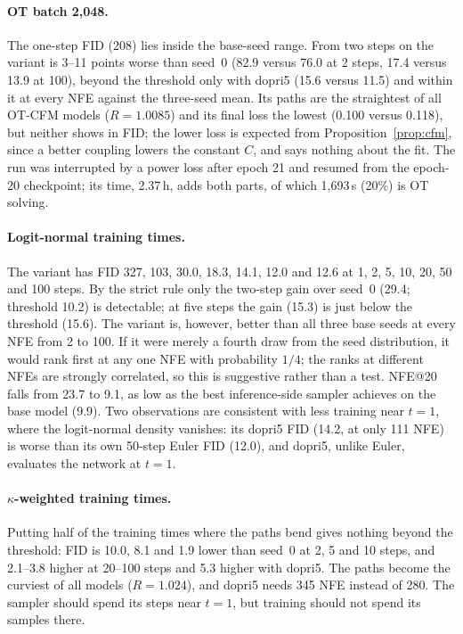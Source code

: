 \paragraph{OT batch 2,048.} The one-step FID (208) lies inside the base-seed range. From two steps on the variant is 3--11 points worse than seed~0 (82.9 versus 76.0 at 2 steps, 17.4 versus 13.9 at 100), beyond the threshold only with dopri5 (15.6 versus 11.5) and within it at every NFE against the three-seed mean. Its paths are the straightest of all OT-CFM models ($R=1.0085$) and its final loss the lowest (0.100 versus 0.118), but neither shows in FID; the lower loss is expected from Proposition~\ref{prop:cfm}, since a better coupling lowers the constant $C$, and says nothing about the fit. The run was interrupted by a power loss after epoch 21 and resumed from the epoch-20 checkpoint; its time, 2.37\,h, adds both parts, of which 1,693\,s (20\%) is OT solving. %
\paragraph{Logit-normal training times.} The variant has FID 327, 103, 30.0, 18.3, 14.1, 12.0 and 12.6 at 1, 2, 5, 10, 20, 50 and 100 steps. By the strict rule only the two-step gain over seed~0 (29.4; threshold 10.2) is detectable; at five steps the gain (15.3) is just below the threshold (15.6). The variant is, however, better than all three base seeds at every NFE from 2 to 100. If it were merely a fourth draw from the seed distribution, it would rank first at any one NFE with probability $1/4$; the ranks at different NFEs are strongly correlated, so this is suggestive rather than a test. NFE@20 falls from 23.7 to 9.1, as low as the best inference-side sampler achieves on the base model (9.9). Two observations are consistent with less training near $t=1$, where the logit-normal density vanishes: its dopri5 FID (14.2, at only 111 NFE) is worse than its own 50-step Euler FID (12.0), and dopri5, unlike Euler, evaluates the network at $t=1$. %
\paragraph{$\kappa$-weighted training times.} Putting half of the training times where the paths bend gives nothing beyond the threshold: FID is 10.0, 8.1 and 1.9 lower than seed~0 at 2, 5 and 10 steps, and 2.1--3.8 higher at 20--100 steps and 5.3 higher with dopri5. The paths become the curviest of all models ($R=1.024$), and dopri5 needs 345 NFE instead of 280. The sampler should spend its steps near $t=1$, but training should not spend its samples there. %
